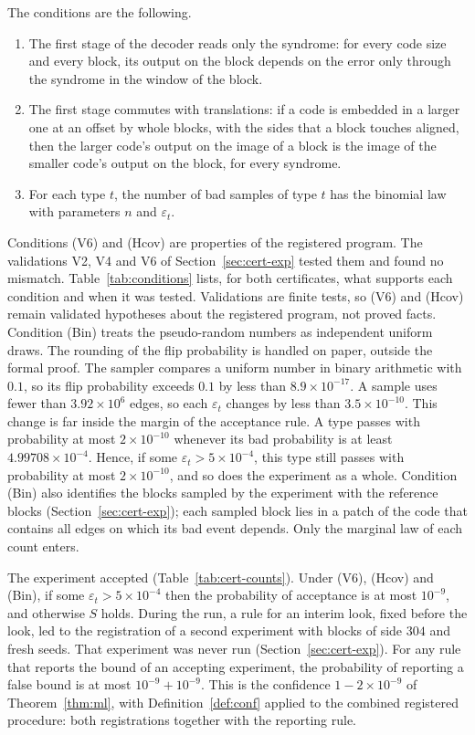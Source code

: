 \documentclass[11pt]{amsart}
\theoremstyle{definition}
\theoremstyle{remark}
\numberwithin{equation}{section}
\begin{document}
The conditions are the following.
\begin{enumerate}[label=(\textup{\arabic*}),leftmargin=2em]
\item[(V6)] The first stage of the decoder reads only the syndrome: for every code size and every block, its output on the block depends on the error only through the syndrome in the window of the block.
\item[(Hcov)] The first stage commutes with translations: if a code is embedded in a larger one at an offset by whole blocks, with the sides that a block touches aligned, then the larger code's output on the image of a block is the image of the smaller code's output on the block, for every syndrome.
\item[(Bin)] For each type $t$, the number of bad samples of type $t$ has the binomial law with parameters $n$ and $\varepsilon_t$.
\end{enumerate}
Conditions (V6) and (Hcov) are properties of the registered program. The validations V2, V4 and V6 of Section~\ref{sec:cert-exp} tested them and found no mismatch. Table~\ref{tab:conditions} lists, for both certificates, what supports each condition and when it was tested. Validations are finite tests, so (V6) and (Hcov) remain validated hypotheses about the registered program, not proved facts. Condition (Bin) treats the pseudo-random numbers as independent uniform draws. The rounding of the flip probability is handled on paper, outside the formal proof. The sampler compares a uniform number in binary arithmetic with $0.1$, so its flip probability exceeds $0.1$ by less than $8.9\times10^{-17}$. A sample uses fewer than $3.92\times10^{6}$ edges, so each $\varepsilon_t$ changes by less than $3.5\times10^{-10}$. This change is far inside the margin of the acceptance rule. A type passes with probability at most $2\times10^{-10}$ whenever its bad probability is at least $4.99708\times10^{-4}$. Hence, if some $\varepsilon_t>5\times10^{-4}$, this type still passes with probability at most $2\times10^{-10}$, and so does the experiment as a whole. Condition (Bin) also identifies the blocks sampled by the experiment with the reference blocks (Section~\ref{sec:cert-exp}); each sampled block lies in a patch of the code that contains all edges on which its bad event depends. Only the marginal law of each count enters.

The experiment accepted (Table~\ref{tab:cert-counts}). Under (V6), (Hcov) and (Bin), if some $\varepsilon_t>5\times10^{-4}$ then the probability of acceptance is at most $10^{-9}$, and otherwise $S$ holds. During the run, a rule for an interim look, fixed before the look, led to the registration of a second experiment with blocks of side $304$ and fresh seeds. That experiment was never run (Section~\ref{sec:cert-exp}). For any rule that reports the bound of an accepting experiment, the probability of reporting a false bound is at most $10^{-9}+10^{-9}$. This is the confidence $1-2\times10^{-9}$ of Theorem~\ref{thm:ml}, with Definition~\ref{def:conf} applied to the combined registered procedure: both registrations together with the reporting rule.
\end{document}
